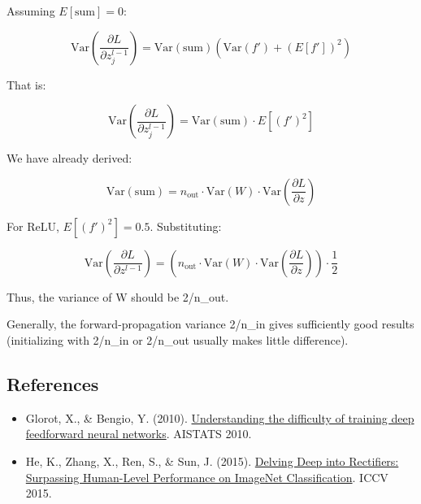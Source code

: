 Assuming \(E[\mathrm{sum}]=0\):

\[
\mathrm{Var}\left(\frac{\partial L}{\partial z_j^{l-1}}\right)
=\mathrm{Var}(\mathrm{sum})\left(\mathrm{Var}(f')+(E[f'])^2\right)
\]

That is:

\[
\mathrm{Var}\left(\frac{\partial L}{\partial z_j^{l-1}}\right)
=\mathrm{Var}(\mathrm{sum})\cdot E[(f')^2]
\]

We have already derived:

\[
\mathrm{Var}(\mathrm{sum})
=n_{\mathrm{out}}\cdot\mathrm{Var}(W)\cdot
\mathrm{Var}\left(\frac{\partial L}{\partial z}\right)
\]

For ReLU, \(E[(f')^2]=0.5\). Substituting:

\[
\mathrm{Var}\left(\frac{\partial L}{\partial z^{l-1}}\right)
=\left(n_{\mathrm{out}}\cdot\mathrm{Var}(W)\cdot
\mathrm{Var}\left(\frac{\partial L}{\partial z}\right)\right)\cdot\frac{1}{2}
\]

Thus, the variance of W should be 2/n\_out.

Generally, the forward-propagation variance 2/n\_in gives sufficiently good results (initializing with 2/n\_in or 2/n\_out usually makes little difference).

\FloatBarrier
{}
\hypertarget{references-9}{%
\subsection{References}\label{references-9}}

\vspace{0.25em}
\begin{itemize}
\tightlist
\item
  Glorot, X., \& Bengio, Y. (2010). \href{https://proceedings.mlr.press/v9/glorot10a.html}{Understanding the difficulty of training deep feedforward neural networks}. AISTATS 2010.
\item
  He, K., Zhang, X., Ren, S., \& Sun, J. (2015). \href{https://arxiv.org/abs/1502.01852}{Delving Deep into Rectifiers: Surpassing Human-Level Performance on ImageNet Classification}. ICCV 2015.
\end{itemize}

\clearpage

